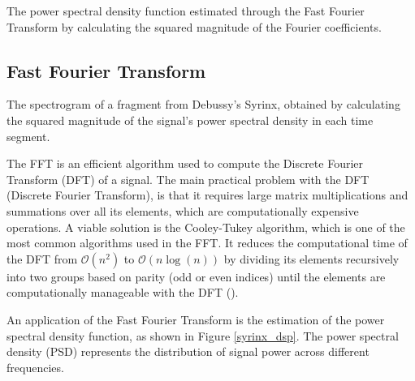 \begin{marginfigure}
\centering

\label{syrinx_audio}
\end{marginfigure}

\begin{marginfigure}
\centering

\caption{The power spectral density function estimated through the Fast Fourier Transform by calculating the squared magnitude of the Fourier coefficients.}
\label{syrinx_dsp}
\end{marginfigure}

\subsection{Fast Fourier Transform}
\label{sec:FFT}
\begin{marginfigure}
\centering
\vspace{1.2cm}

\label{syrinx_sliced}
\end{marginfigure}

\begin{marginfigure}
\centering

\caption{The spectrogram of a fragment from Debussy's Syrinx, obtained by calculating the squared magnitude of the signal's power spectral density in each time segment.}
\label{specgram_syrinx}
\end{marginfigure}
The FFT is an efficient algorithm used to compute the Discrete Fourier Transform (DFT) of a signal. The main practical problem with the DFT (Discrete Fourier Transform), is that it requires large matrix multiplications and summations over all its elements, which are computationally expensive operations. A viable solution is the Cooley-Tukey algorithm, which is one of the most common algorithms used in the FFT. It reduces the computational time of the DFT from $\mathcal{O}(n^2)$ to $\mathcal{O}(n\log(n))$ by dividing its elements recursively into two groups based on parity (odd or even indices) until the elements are computationally manageable with the DFT (\cite{cooley_algorithm_1965}). 

An application of the Fast Fourier Transform is the estimation of the power spectral density function, as shown in Figure \ref{syrinx_dsp}. The power spectral density (PSD) represents the distribution of signal power across different frequencies.


